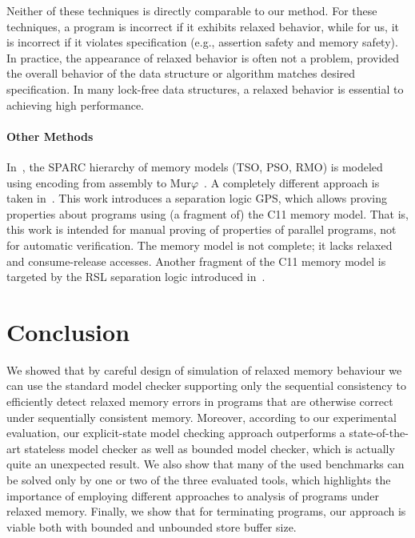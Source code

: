 Neither of these techniques is directly comparable to our method.
For these techniques, a program is incorrect if it exhibits relaxed behavior, while for us, it is incorrect if it violates specification (e.g., assertion safety and memory safety).
In practice, the appearance of relaxed behavior is often not a problem, provided the overall behavior of the data structure or algorithm matches desired specification.
In many lock-free data structures, a relaxed behavior is essential to achieving high performance.

\paragraph{Other Methods}\label{other-methods}

In~, the SPARC hierarchy of memory models (TSO, PSO, RMO) is modeled using encoding from assembly to Mur\(\varphi\)~.
A completely different approach is taken in~.
This work introduces a separation logic GPS, which allows proving properties about programs using (a fragment of) the C11 memory model.
That is, this work is intended for manual proving of properties of parallel programs, not for automatic verification.
The memory model is not complete; it lacks relaxed and consume-release accesses.
Another fragment of the C11 memory model is targeted by the RSL separation logic introduced in~.



\section{Conclusion} \label{sec:conclusion}

We showed that by careful design of simulation of relaxed memory behaviour we
can use the standard model checker supporting only the sequential consistency to
efficiently detect relaxed memory errors in programs that are otherwise correct
under sequentially consistent memory. Moreover, according to our experimental
evaluation, our explicit-state model checking approach outperforms
a state-of-the-art stateless model checker as well as bounded model checker,
which is actually quite an unexpected result. We also show that many of the used
benchmarks can be solved only by one or two of the three evaluated tools, which
highlights the importance of employing different approaches to analysis of programs
under relaxed memory. Finally, we show that for terminating programs, our
approach is viable both with bounded and unbounded store buffer size.

